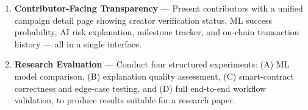 \begin{enumerate}
    \item \textbf{Contributor-Facing Transparency} — Present contributors with a unified campaign detail page showing creator verification status, ML success probability, AI risk explanation, milestone tracker, and on-chain transaction history — all in a single interface.

    \item \textbf{Research Evaluation} — Conduct four structured experiments: (A) ML model comparison, (B) explanation quality assessment, (C) smart-contract correctness and edge-case testing, and (D) full end-to-end workflow validation, to produce results suitable for a research paper.

\end{enumerate}
